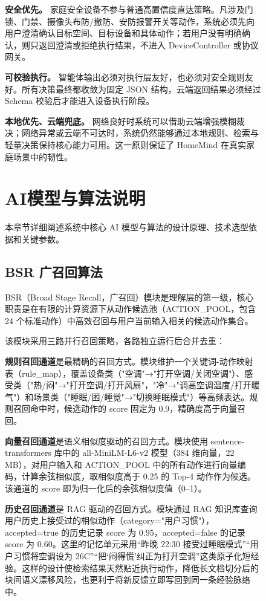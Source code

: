 \documentclass[12pt,a4paper,oneside]{ctexrep}
\begin{document}
\begin{figure}[H]
\textbf{安全优先。} 家庭安全设备不参与普通高置信度直达策略。凡涉及门锁、门禁、摄像头布防/撤防、安防报警开关等动作，系统必须先向用户澄清确认目标空间、目标设备和具体动作；若用户没有明确确认，则只返回澄清或拒绝执行结果，不进入 DeviceController 或协议网关。

\textbf{可校验执行。} 智能体输出必须对执行层友好，也必须对安全规则友好。所有决策最终都收敛为固定 JSON 结构，云端返回结果必须经过 Schema 校验后才能进入设备执行阶段。

\textbf{本地优先、云端兜底。} 网络良好时系统可以借助云端增强模糊裁决；网络异常或云端不可达时，系统仍然能够通过本地规则、检索与轻量决策保持核心能力可用。这一原则保证了 HomeMind 在真实家庭场景中的韧性。

\chapter{AI模型与算法说明}

本章节详细阐述系统中核心 AI 模型与算法的设计原理、技术选型依据和关键参数。

\section{BSR 广召回算法}

BSR（Broad Stage Recall，广召回）模块是理解层的第一级，核心职责是在有限的计算资源下从动作候选池（ACTION\_POOL，包含 24 个标准动作）中高效召回与用户当前输入相关的候选动作集合。

该模块采用三路并行召回策略，各路独立运行后合并去重：

\textbf{规则召回通道}是最精确的召回方式。模块维护一个关键词-动作映射表（rule\_map），覆盖设备类（"空调"→"打开空调/关闭空调"）、感受类（"热/闷"→"打开空调/打开风扇"，"冷"→"调高空调温度/打开暖气"）和场景类（"睡眠/困/睡觉"→"切换睡眠模式"）等高频表达。规则召回命中时，候选动作的 score 固定为 0.9，精确度高于向量召回。

\textbf{向量召回通道}是语义相似度驱动的召回方式。模块使用 sentence-transformers 库中的 all-MiniLM-L6-v2 模型（384 维向量，22 MB），对用户输入和 ACTION\_POOL 中的所有动作进行向量编码，计算余弦相似度，取相似度高于 0.25 的 Top-4 动作作为候选。该通道的 score 即为归一化后的余弦相似度值（0--1）。

\textbf{历史召回通道}是 RAG 驱动的召回方式。模块通过 RAG 知识库查询用户历史上接受过的相似动作（category="用户习惯"），accepted=true 的历史记录 score 为 0.95，accepted=false 的记录 score 为 0.60。这里的记忆单元采用“昨晚 22:30 接受过睡眠模式”“用户习惯将空调设为 26\textdegree C”“把‘闷得慌’纠正为打开空调”这类原子化短经验。这样的设计使检索结果天然贴近执行动作，降低长文档切分后的块间语义漂移风险，也更利于将新反馈立即写回到同一条经验脉络中。


\end{figure}
\end{document}

